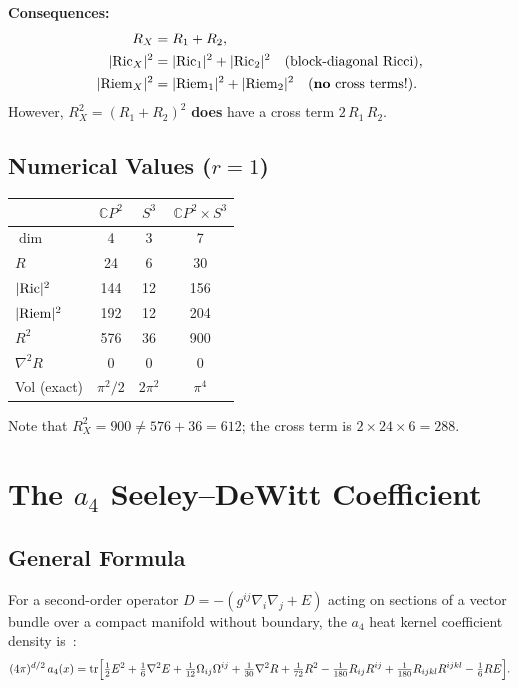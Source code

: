 \documentclass[11pt,a4paper]{article}
\begin{document}
\noindent
\textbf{Consequences:}
\begin{align}
R_X &= R_1 + R_2, \\
|{\rm Ric}_X|^2 &= |{\rm Ric}_1|^2 + |{\rm Ric}_2|^2
  \quad\text{(block-diagonal Ricci)}, \\
|{\rm Riem}_X|^2 &= |{\rm Riem}_1|^2 + |{\rm Riem}_2|^2
  \quad\text{(\textbf{no} cross terms!)}.
\end{align}
However, $R_X^2 = (R_1 + R_2)^2$ \textbf{does} have a cross term
$2\,R_1\,R_2$.

\subsection{Numerical Values ($r = 1$)}

\begin{center}
\begin{tabular}{lccc}
\toprule
& $\mathbb{C}P^2$ & $S^3$ & $\mathbb{C}P^2 \times S^3$ \\
\midrule
$\dim$ & 4 & 3 & 7 \\
$R$ & 24 & 6 & 30 \\
$|{\rm Ric}|^2$ & 144 & 12 & 156 \\
$|{\rm Riem}|^2$ & 192 & 12 & 204 \\
$R^2$ & 576 & 36 & 900 \\
$\nabla^2 R$ & 0 & 0 & 0 \\
Vol (exact) & $\pi^2/2$ & $2\pi^2$ & $\pi^4$ \\
\bottomrule
\end{tabular}
\end{center}

\noindent
Note that $R_X^2 = 900 \neq 576 + 36 = 612$; the cross term is
$2 \times 24 \times 6 = 288$.


\section{The $a_4$ Seeley--DeWitt Coefficient}

\subsection{General Formula}

For a second-order operator $D = -(g^{ij}\nabla_i\nabla_j + E)$ acting on
sections of a vector bundle over a compact manifold without boundary, the
$a_4$ heat kernel coefficient density is~\cite{Vassilevich2003,Gilkey1995}:
\begin{equation}\label{eq:a4-general}
(4\pi)^{d/2}\,a_4(x) = \mathrm{tr}\Bigl[
  \tfrac{1}{2}E^2 + \tfrac{1}{6}\nabla^2 E
  + \tfrac{1}{12}\Omega_{ij}\Omega^{ij}
  + \tfrac{1}{30}\nabla^2 R
  + \tfrac{1}{72}R^2
  - \tfrac{1}{180}R_{ij}R^{ij}
  + \tfrac{1}{180}R_{ijkl}R^{ijkl}
  - \tfrac{1}{6}RE
\Bigr].
\end{equation}
\end{document}
